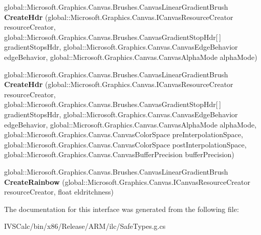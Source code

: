 \begin{DoxyCompactItemize}
\item 
\mbox{\label{interface_microsoft_1_1_graphics_1_1_canvas_1_1_brushes_1_1_i_canvas_linear_gradient_brush_statics_a9d2b811c75f53b8dd5784da5b0d87a96}} 
global\+::\+Microsoft.\+Graphics.\+Canvas.\+Brushes.\+Canvas\+Linear\+Gradient\+Brush {\bfseries Create\+Hdr} (global\+::\+Microsoft.\+Graphics.\+Canvas.\+I\+Canvas\+Resource\+Creator resource\+Creator, global\+::\+Microsoft.\+Graphics.\+Canvas.\+Brushes.\+Canvas\+Gradient\+Stop\+Hdr\mbox{[}$\,$\mbox{]} gradient\+Stops\+Hdr, global\+::\+Microsoft.\+Graphics.\+Canvas.\+Canvas\+Edge\+Behavior edge\+Behavior, global\+::\+Microsoft.\+Graphics.\+Canvas.\+Canvas\+Alpha\+Mode alpha\+Mode)
\item 
\mbox{\label{interface_microsoft_1_1_graphics_1_1_canvas_1_1_brushes_1_1_i_canvas_linear_gradient_brush_statics_a12d4c23a29a2ebceddbe80b2d3bd32de}} 
global\+::\+Microsoft.\+Graphics.\+Canvas.\+Brushes.\+Canvas\+Linear\+Gradient\+Brush {\bfseries Create\+Hdr} (global\+::\+Microsoft.\+Graphics.\+Canvas.\+I\+Canvas\+Resource\+Creator resource\+Creator, global\+::\+Microsoft.\+Graphics.\+Canvas.\+Brushes.\+Canvas\+Gradient\+Stop\+Hdr\mbox{[}$\,$\mbox{]} gradient\+Stops\+Hdr, global\+::\+Microsoft.\+Graphics.\+Canvas.\+Canvas\+Edge\+Behavior edge\+Behavior, global\+::\+Microsoft.\+Graphics.\+Canvas.\+Canvas\+Alpha\+Mode alpha\+Mode, global\+::\+Microsoft.\+Graphics.\+Canvas.\+Canvas\+Color\+Space pre\+Interpolation\+Space, global\+::\+Microsoft.\+Graphics.\+Canvas.\+Canvas\+Color\+Space post\+Interpolation\+Space, global\+::\+Microsoft.\+Graphics.\+Canvas.\+Canvas\+Buffer\+Precision buffer\+Precision)
\item 
\mbox{\label{interface_microsoft_1_1_graphics_1_1_canvas_1_1_brushes_1_1_i_canvas_linear_gradient_brush_statics_a10b64033cc76bb4670af23e94b8b6d1c}} 
global\+::\+Microsoft.\+Graphics.\+Canvas.\+Brushes.\+Canvas\+Linear\+Gradient\+Brush {\bfseries Create\+Rainbow} (global\+::\+Microsoft.\+Graphics.\+Canvas.\+I\+Canvas\+Resource\+Creator resource\+Creator, float eldritchness)
\end{DoxyCompactItemize}


The documentation for this interface was generated from the following file\+:\begin{DoxyCompactItemize}
\item 
I\+V\+S\+Calc/bin/x86/\+Release/\+A\+R\+M/ilc/Safe\+Types.\+g.\+cs\end{DoxyCompactItemize}
